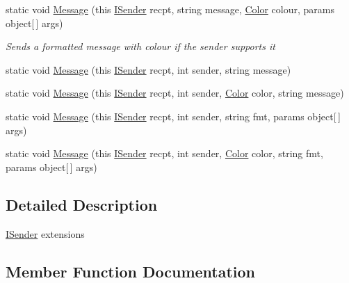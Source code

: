 \begin{DoxyCompactItemize}
static void \hyperlink{classOTA_1_1Command_1_1ISenderExtensions_a2d9eb5c77747780962f0d84a4774b1a2}{Message} (this \hyperlink{interfaceOTA_1_1Command_1_1ISender}{I\+Sender} recpt, string message, \hyperlink{structMicrosoft_1_1Xna_1_1Framework_1_1Color}{Color} colour, params object\mbox{[}$\,$\mbox{]} args)
\begin{DoxyCompactList}\small\item\em Sends a formatted message with colour if the sender supports it \end{DoxyCompactList}\item 
static void \hyperlink{classOTA_1_1Command_1_1ISenderExtensions_a5cbd8d76c7a9886dc89b89595ddae058}{Message} (this \hyperlink{interfaceOTA_1_1Command_1_1ISender}{I\+Sender} recpt, int sender, string message)
\item 
static void \hyperlink{classOTA_1_1Command_1_1ISenderExtensions_a0a465998faa718315672a7654124a8fd}{Message} (this \hyperlink{interfaceOTA_1_1Command_1_1ISender}{I\+Sender} recpt, int sender, \hyperlink{structMicrosoft_1_1Xna_1_1Framework_1_1Color}{Color} color, string message)
\item 
static void \hyperlink{classOTA_1_1Command_1_1ISenderExtensions_aa0a7e85a9bafa99c7fb7e571e985b5d3}{Message} (this \hyperlink{interfaceOTA_1_1Command_1_1ISender}{I\+Sender} recpt, int sender, string fmt, params object\mbox{[}$\,$\mbox{]} args)
\item 
static void \hyperlink{classOTA_1_1Command_1_1ISenderExtensions_a908f8c885bc33f717df804669676b6b1}{Message} (this \hyperlink{interfaceOTA_1_1Command_1_1ISender}{I\+Sender} recpt, int sender, \hyperlink{structMicrosoft_1_1Xna_1_1Framework_1_1Color}{Color} color, string fmt, params object\mbox{[}$\,$\mbox{]} args)
\end{DoxyCompactItemize}


\subsection{Detailed Description}
\hyperlink{interfaceOTA_1_1Command_1_1ISender}{I\+Sender} extensions 



\subsection{Member Function Documentation}
\hypertarget{classOTA_1_1Command_1_1ISenderExtensions_a626f661c3944fd7b282784321166f544}{}
